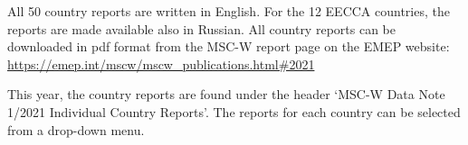 
All 50 country reports are written in English. For the 12 EECCA countries, the reports are made available also in Russian. All country reports can be downloaded in pdf format from the MSC-W report page on the EMEP website:\\
\url{https://emep.int/mscw/mscw_publications.html#2021}

This year, the country reports are found under the header `MSC-W Data Note 1/2021 Individual Country Reports'. The reports for each country can be selected from a drop-down menu.


\renewcommand\bibname{References}      %
